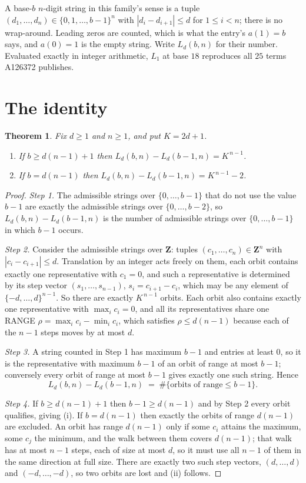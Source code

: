 \documentclass[11pt,a4paper]{article}
\theoremstyle{plain}
\newtheorem{theorem}{Theorem}
\theoremstyle{definition}
\begin{document}
A base-$b$ $n$-digit string in this family's sense is a tuple
$(d_1,\dots,d_n)\in\{0,1,\dots,b-1\}^{n}$ with $|d_i-d_{i+1}|\le d$ for $1\le i<n$; there
is no wrap-around. Leading zeros are counted, which is what the entry's $a(1)=b$ says, and
$a(0)=1$ is the empty string. Write $L_d(b,n)$ for their number. Evaluated exactly in integer
arithmetic, $L_{1}$ at base $18$ reproduces all $25$ terms A126372 publishes.

\section{The identity}

\begin{theorem}
Fix $d\ge1$ and $n\ge1$, and put $K=2d+1$.
\begin{enumerate}
\item[(i)] If $b\ge d(n-1)+1$ then $L_d(b,n)-L_d(b-1,n)=K^{\,n-1}$.
\item[(ii)] If $b=d(n-1)$ then $L_d(b,n)-L_d(b-1,n)=K^{\,n-1}-2$.
\end{enumerate}
\end{theorem}

\begin{proof}
\emph{Step 1.} The admissible strings over $\{0,\dots,b-1\}$ that do not use the value $b-1$
are exactly the admissible strings over $\{0,\dots,b-2\}$, so $L_d(b,n)-L_d(b-1,n)$ is the
number of admissible strings over $\{0,\dots,b-1\}$ in which $b-1$ occurs.

\emph{Step 2.} Consider the admissible strings over $\mathbf{Z}$: tuples
$(c_1,\dots,c_n)\in\mathbf{Z}^{n}$ with $|c_i-c_{i+1}|\le d$. Translation by an integer acts
freely on them, each orbit contains exactly one representative with $c_1=0$, and such a
representative is determined by its step vector $(s_1,\dots,s_{n-1})$, $s_i=c_{i+1}-c_i$,
which may be any element of $\{-d,\dots,d\}^{n-1}$. So there are exactly $K^{\,n-1}$ orbits.
Each orbit also contains exactly one representative with $\max_i c_i=0$, and all its
representatives share one RANGE $\rho=\max_ic_i-\min_ic_i$, which satisfies
$\rho\le d(n-1)$ because each of the $n-1$ steps moves by at most $d$.

\emph{Step 3.} A string counted in Step 1 has maximum $b-1$ and entries at least $0$, so it is
the representative with maximum $b-1$ of an orbit of range at most $b-1$; conversely every orbit
of range at most $b-1$ gives exactly one such string. Hence
\[
L_d(b,n)-L_d(b-1,n)\;=\;\#\{\text{orbits of range}\le b-1\} .
\]

\emph{Step 4.} If $b\ge d(n-1)+1$ then $b-1\ge d(n-1)$ and by Step 2 every orbit qualifies,
giving (i). If $b=d(n-1)$ then exactly the orbits of range $d(n-1)$ are excluded. An orbit has
range $d(n-1)$ only if some $c_i$ attains the maximum, some $c_j$ the minimum, and the walk
between them covers $d(n-1)$; that walk has at most $n-1$ steps, each of size at most $d$, so it
must use all $n-1$ of them in the same direction at full size. There are exactly two such step
vectors, $(d,\dots,d)$ and $(-d,\dots,-d)$, so two orbits are lost and (ii) follows.
\end{proof}
\end{document}
